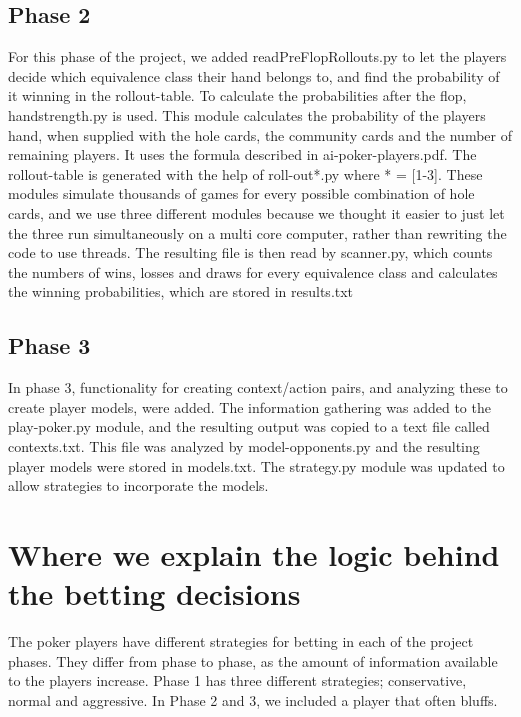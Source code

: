 \documentclass[titlepage]{article}
\begin{document}
\begin{itemize}
	\subsection{Phase 2}
		For this phase of the project, we added readPreFlopRollouts.py to let the players decide which equivalence class their hand belongs to, and find the probability of it winning in the rollout-table. To calculate the probabilities after the flop, handstrength.py is used. This module calculates the probability of the players hand, when supplied with the hole cards, the community cards and the number of remaining players. It uses the formula described in ai-poker-players.pdf. The rollout-table is generated with the help of roll-out*.py where * = [1-3]. These modules simulate thousands of games for every possible combination of hole cards, and we use three different modules because we thought it easier to just let the three run simultaneously on a multi core computer, rather than rewriting the code to use threads. The resulting file is then read by scanner.py, which counts the numbers of wins, losses and draws for every equivalence class and calculates the winning probabilities, which are stored in results.txt
		
    \subsection{Phase 3}
        In phase 3, functionality for creating context/action pairs, and analyzing these to create player models, were added. The information gathering was added to the play-poker.py module, and the resulting output was copied to a text file called contexts.txt. This file was analyzed by model-opponents.py and the resulting player models were stored in models.txt. The strategy.py module was updated to allow strategies to incorporate the models. 

\section{Where we explain the logic behind the betting decisions}
	The poker players have different strategies for betting in each of the project phases. They differ from phase to phase, as the amount of information available to the players increase. Phase 1 has three different strategies; conservative, normal and aggressive. In Phase 2 and 3, we included a player that often bluffs.
	

\end{itemize}
\end{document}
